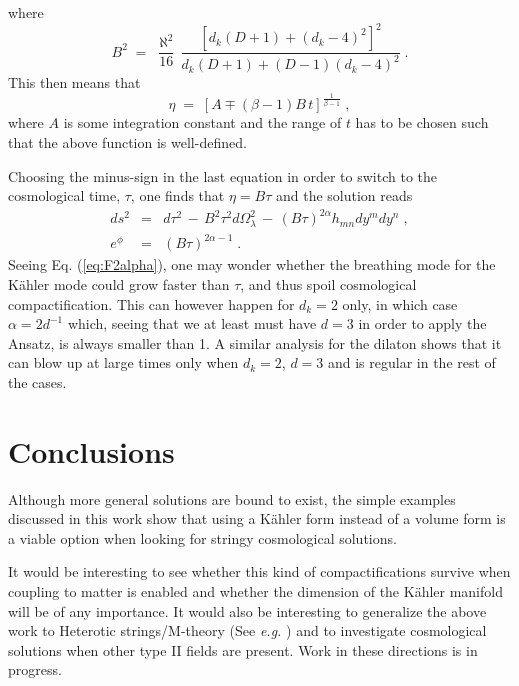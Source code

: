 \documentclass[a4paper,11pt]{article}
\begin{document}
where 
\begin{equation}
B^{2} \;=\; \frac{\aleph^{2}}{16}\,
            \frac{\left[ 
                     d_{k}(D+1) +(d_{k}-4)^{2} 
                  \right]^{2}}{d_{k}(D+1)+(D-1)(d_{k}-4)^{2}} \; .
\end{equation}
This then means that 
\begin{equation}
\eta \;=\; \left[ A\mp (\beta -1)B\, t\right]^{\frac{1}{\beta -1}} \; ,
\end{equation}
where $A$ is some integration constant and the range of $t$ has to be chosen
such that the above function is well-defined.
\par
Choosing the minus-sign in the last equation in order to switch to the 
cosmological time, $\tau$, one finds that $\eta = B\tau$ and the solution
reads
\begin{eqnarray}
ds^{2} &=& d\tau^{2}
       \,-\, B^{2}\tau^{2}d\Omega^{2}_{\lambda}
       \,-\, \left( B\tau\right)^{2\alpha}h_{mn}dy^{m}dy^{n} \; ,\\
e^{\phi} &=& \left( B\tau\right)^{2\alpha -1} \; .
\end{eqnarray}
Seeing Eq. (\ref{eq:F2alpha}), one may wonder whether the breathing mode
for the K\"ahler mode could grow faster than $\tau$, and thus spoil
cosmological compactification. This can however happen for $d_{k}=2$
only, in which case $\alpha =2d^{-1}$ which, seeing that we at least must
have $d=3$ in order to apply the Ansatz, is always smaller than 1.
A similar analysis for the dilaton shows that it can blow up at 
large times only when $d_{k}=2$, $d=3$
and is regular in the rest of the cases.
\section{Conclusions}
Although more general solutions are bound to exist,
the simple examples 
discussed in this work show that using a K\"ahler form instead of
a volume form is a viable option when looking for stringy cosmological
solutions.
\par
It would be interesting to see whether this kind of compactifications
survive when coupling to matter is enabled and whether
the dimension of the K\"ahler manifold will be of any importance.
It would also be interesting to generalize the above work to Heterotic
strings/M-theory (See {\em e.g.} \cite{art:Maeda})
and to investigate cosmological
solutions when other type II fields are present. 
Work in these directions is in progress.
\end{document}
